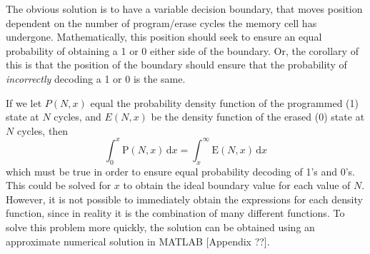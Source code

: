 \documentclass[11pt]{article}
\numberwithin{equation}{subsection}
\begin{document}
The obvious solution is to have a variable decision boundary, that moves position dependent on the number of program/erase cycles the memory cell has undergone. Mathematically, this position should seek to ensure an equal probability of obtaining a 1 or 0 either side of the boundary. Or, the corollary of this is that the position of the boundary should ensure that the probability of \textit{incorrectly} decoding a 1 or 0 is the same. 

If we let $P(N,x)$ equal the probability density function of the programmed (1) state at $N$ cycles, and $E(N,x)$ be the density function of the erased (0) state at $N$ cycles, then
\begin{equation}
\int_0^x \mathrm{P}(N,x)\,\mathrm{d}x = \int_x^\infty \mathrm{E}(N,x)\,\mathrm{d}x
\end{equation}
which must be true in order to ensure equal probability decoding of 1's and 0's. This could be solved for $x$ to obtain the ideal boundary value for each value of $N$. However, it is not possible to immediately obtain the expressions for each density function, since in reality it is the combination of many different functions. To solve this problem more quickly, the solution can be obtained using an approximate numerical solution in MATLAB [Appendix ??]. 
\end{document}
